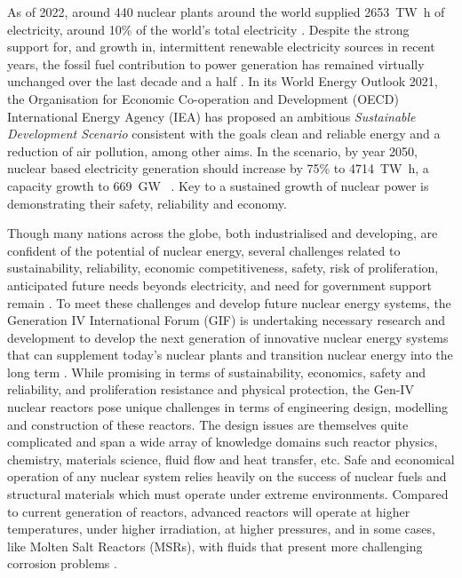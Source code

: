 	As of 2022, around 440 nuclear plants around the world supplied \SI{2653}{\tera\watt\hour} of electricity, around 10\% of the world's total electricity \cite{WNA:2019aa}. Despite the strong support for, and growth in, intermittent renewable electricity sources in recent years, the fossil fuel contribution to power generation has remained virtually unchanged over the last decade and a half \cite{WNA:2019aa}. In its World Energy Outlook 2021, the Organisation for Economic Co-operation and Development (OECD) International Energy Agency (IEA)  has proposed an ambitious \emph{Sustainable Development Scenario} consistent with the goals clean and reliable energy and a reduction of air pollution, among other aims. In the scenario, by year 2050, nuclear based electricity generation should increase by 75\% to \SI{4714}{\tera\watt\hour}, a  capacity growth to \SI{669}{\giga\watt\electric} \cite{IEA:2018aa}. Key to a sustained growth of nuclear power is demonstrating their safety, reliability and economy.
	
	Though many nations across the globe, both industrialised and developing, are confident of the potential of nuclear energy, several challenges related to sustainability, reliability, economic competitiveness, safety, risk of proliferation, anticipated future needs beyonds electricity, and need for government support  remain \cite{GIF:2009aa}. To meet these challenges and develop future nuclear energy systems, the Generation {IV} International Forum (GIF) is undertaking necessary research and development to develop the next generation of innovative nuclear energy systems that can supplement today's nuclear plants and transition nuclear energy into the long term \cite{GIF:2019aa}. While promising in terms of sustainability, economics, safety and reliability, and proliferation resistance and physical protection, the Gen-{IV} nuclear reactors pose unique challenges in terms of engineering design, modelling and construction of these reactors. The design issues are themselves quite complicated and span a wide array of knowledge domains such reactor physics, chemistry, materials science, fluid flow and heat transfer, etc. Safe and economical operation of any nuclear system relies heavily on the success of nuclear fuels and structural materials which must operate under extreme environments. Compared to current generation of reactors, advanced reactors will operate at higher temperatures, under higher irradiation, at higher pressures, and in some cases, like Molten Salt Reactors (MSRs), with fluids that present more challenging corrosion problems \cite{Allen:2010aa}.

